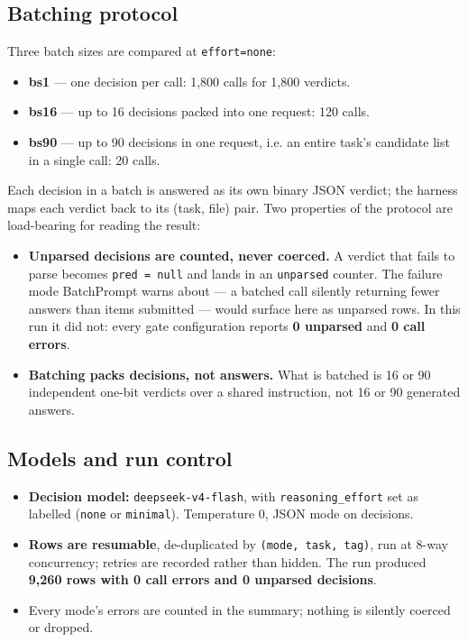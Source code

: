 \documentclass[11pt,a4paper]{article}
\begin{document}
\subsection{Batching protocol}

Three batch sizes are compared at \texttt{effort=none}:

\begin{itemize}
\item \textbf{bs1} --- one decision per call: 1,800 calls for 1,800 verdicts.
\item \textbf{bs16} --- up to 16 decisions packed into one request: 120 calls.
\item \textbf{bs90} --- up to 90 decisions in one request, i.e. an entire task's candidate list in a single call: 20 calls.
\end{itemize}

Each decision in a batch is answered as its own binary JSON verdict; the harness maps each verdict back to its (task, file) pair. Two properties of the protocol are load-bearing for reading the result:

\begin{itemize}
\item \textbf{Unparsed decisions are counted, never coerced.} A verdict that fails to parse becomes \texttt{pred = null} and lands in an \texttt{unparsed} counter. The failure mode BatchPrompt warns about --- a batched call silently returning fewer answers than items submitted --- would surface here as unparsed rows. In this run it did not: every gate configuration reports \textbf{0 unparsed} and \textbf{0 call errors}.
\item \textbf{Batching packs decisions, not answers.} What is batched is 16 or 90 independent one-bit verdicts over a shared instruction, not 16 or 90 generated answers.
\end{itemize}

\subsection{Models and run control}

\begin{itemize}
\item \textbf{Decision model:} \texttt{deepseek-v4-flash}, with \texttt{reasoning\_effort} set as labelled (\texttt{none} or \texttt{minimal}). Temperature 0, JSON mode on decisions.
\item \textbf{Rows are resumable}, de-duplicated by \texttt{(mode, task, tag)}, run at 8-way concurrency; retries are recorded rather than hidden. The run produced \textbf{9,260 rows with 0 call errors and 0 unparsed decisions}.
\item Every mode's errors are counted in the summary; nothing is silently coerced or dropped.
\end{itemize}
\end{document}
